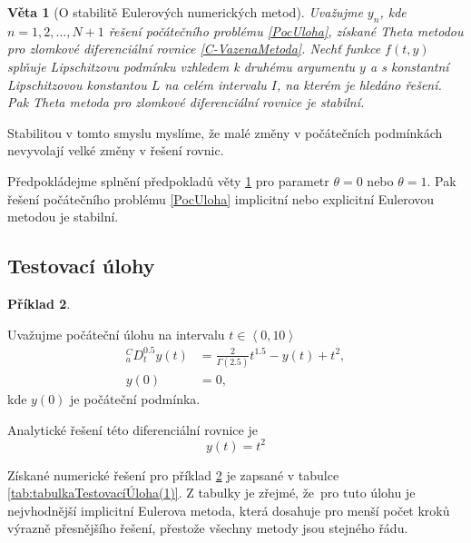 \documentclass[a4paper,12pt,twoside]{article}
\newtheorem{veta}{Věta}[section]
\theoremstyle{definition}
\newtheorem{prikl}[veta]{Příklad}
\theoremstyle{remark}
\numberwithin{equation}{section}
\numberwithin{table}{section}
\numberwithin{figure}{section}
\begin{document}
\begin{veta} [O stabilitě Eulerových numerických metod] \label{StabilityOfEuler}
	Uvažujme $y_{n}$, kde $n = 1,2,...,N+1$ řešení počátečního problému \eqref{PocUloha}, získané Theta metodou pro zlomkové diferenciální rovnice \eqref{C-VazenaMetoda}. Nechť funkce $f\left(t,y\right)$ splňuje Lipschitzovu podmínku vzhledem k druhému argumentu $y$ a s konstantní Lipschitzovou konstantou $L$ na celém intervalu $I$, na kterém je hledáno řešení. Pak Theta metoda pro zlomkové diferenciální rovnice je stabilní.
\end{veta}
Stabilitou v tomto smyslu myslíme, že  malé změny v počátečních podmínkách nevyvolají velké změny v řešení rovnic.

Předpokládejme splnění předpokladů věty \ref{StabilityOfEuler} pro parametr $\theta = 0$ nebo $\theta = 1$. Pak řešení počátečního problému \eqref{PocUloha} implicitní nebo explicitní Eulerovou metodou je stabilní.



\subsection{Testovací úlohy}

	\begin{prikl}\label{TestovaciUloha1}

	Uvažujme počáteční úlohu na intervalu $ t \in \left\langle 0,10\right\rangle$
	\begin{equation}
		\begin{aligned}
			^{C}_{a}D_{t}^{0.5} y\left(t\right) &= \frac{2}{\Gamma\left(2.5\right)}t^{1.5} - y\left(t\right) + t^{2}, \\
			y\left(0\right) &= 0,
		\end{aligned} 
	\end{equation}
	kde $y\left(0\right)$ je počáteční podmínka. 

	Analytické řešení této diferenciální rovnice je \cite{LiYe}
	\begin{equation}
		y \left(t\right) = t^{2} 
	\end{equation}

	Získané numerické řešení pro příklad \ref{TestovaciUloha1} je zapsané v tabulce \ref{tab:tabulkaTestovacíÚloha(1)}. Z tabulky je zřejmé, že~pro tuto úlohu je nejvhodnější implicitní Eulerova metoda, která dosahuje pro menší počet kroků výrazně přesnějšího řešení, přestože všechny metody jsou stejného řádu.
\end{prikl}
\end{document}
